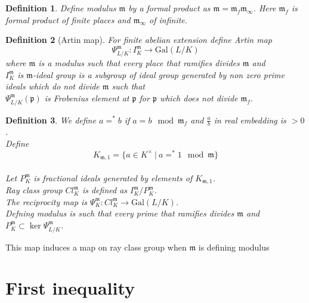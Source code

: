\documentclass[twoside, 12pt]{iiser-thesis}
\newtheorem{defi}{ Definition}[section]
\newcommand{\gal}{\text{Gal}}
\newcommand{\x}{\times}
\begin{document}
\begin{defi}
Define modulus $\mathfrak m $ by a formal product as $\mathfrak m = \mathfrak m_f \mathfrak m _{\infty} $. Here $\mathfrak m _f$ is formal product of finite places and $\mathfrak m _\infty $ of infinite.
\end{defi}

\begin{defi}[Artin map]
For finite abelian extension define Artin map \[\Psi _{L/K} ^\mathfrak m : I ^\mathfrak m _K \rightarrow \gal (L/K) \]
where $\mathfrak m$ is a modulus such that every place that ramifies divides $\mathfrak m$ and \\
 $I ^\mathfrak m _K$ is $\mathfrak m$-ideal group is a subgroup of ideal group generated by non zero prime ideals which do not divide $\mathfrak m$ such that \\
 $\Psi ^\mathfrak m _{L/K} (\mathfrak p)$ is Frobenius element at $\mathfrak p$ for $\mathfrak p$ which does not divide $\mathfrak m _f$.
 \end{defi}
 
\begin{defi} 
We define $a = ^* b$ if $a=b \mod \mathfrak m_f $ and $\frac{a}{b}$ in real embedding is $>0$. \\
Define \[K_{\mathfrak m ,1}= \{ a \in K^\x \ | \ a = ^* 1 \mod \mathfrak m\} \] \\
Let $P^ \mathfrak m _K$ is fractional ideals generated by elements of $K_{\mathfrak m, 1}$. \\
Ray class group $Cl_K ^\mathfrak m$ is defined as $I_K ^\mathfrak m / P_K ^\mathfrak m $. \\
The reciprocity map is $\Psi _K ^\mathfrak m : Cl_K ^\mathfrak m \rightarrow \gal (L/K)$.\\ 
Defning modulus is such that every prime that ramifies divides $\mathfrak m$ and $P^\mathfrak m _K \subset \ker \Psi ^\mathfrak m _{L/K}$. 
\end{defi}
 This map induces a map on ray class group when $\mathfrak m$ is defining modulus 
\section{First inequality}
\end{document}
